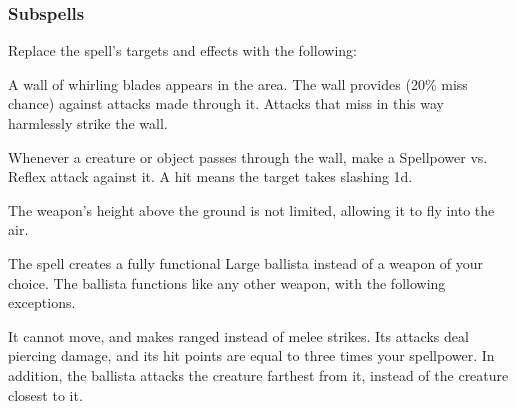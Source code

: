 \subsubsection{Subspells}





Replace the spell's targets and effects with the following:
\begin{spellcontent}

\begin{augmenttargetinginfo}




\end{augmenttargetinginfo}


\begin{augmenteffects}



\spelleffect
A wall of whirling blades appears in the area.
The wall provides  (20\% miss chance) against attacks made through it.
Attacks that miss in this way harmlessly strike the wall.

Whenever a creature or object passes through the wall, make a Spellpower vs. Reflex attack against it.
A hit means the target takes slashing  \minus1d.








\end{augmenteffects}

\end{spellcontent}






The weapon's height above the ground is not limited, allowing it to fly into the air.







The spell creates a fully functional Large ballista instead of a weapon of your choice.
The ballista functions like any other weapon, with the following exceptions.

It cannot move, and makes ranged  instead of melee strikes.
Its attacks deal piercing damage, and its hit points are equal to three times your spellpower.
In addition, the ballista attacks the creature farthest from it, instead of the creature closest to it.






